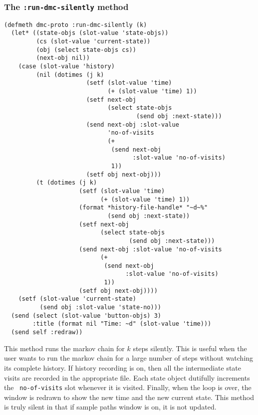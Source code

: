 \subsubsection{The {\tt :run-dmc-silently} method}
\label{subsubsec:run-dmc-silently}
\begin{verbatim}
(defmeth dmc-proto :run-dmc-silently (k)
  (let* ((state-objs (slot-value 'state-objs))
         (cs (slot-value 'current-state))
         (obj (select state-objs cs))
         (next-obj nil))
    (case (slot-value 'history)
         (nil (dotimes (j k)
                       (setf (slot-value 'time)
                             (+ (slot-value 'time) 1))
                       (setf next-obj 
                             (select state-objs 
                                     (send obj :next-state)))
                       (send next-obj :slot-value 
                             'no-of-visits 
                             (+ 
                              (send next-obj 
                                    :slot-value 'no-of-visits)
                              1))
                       (setf obj next-obj)))
         (t (dotimes (j k)
                     (setf (slot-value 'time)
                           (+ (slot-value 'time) 1))
                     (format *history-file-handle* "~d~%" 
                             (send obj :next-state))
                     (setf next-obj 
                           (select state-objs 
                                   (send obj :next-state)))
                     (send next-obj :slot-value 'no-of-visits 
                           (+ 
                            (send next-obj 
                                  :slot-value 'no-of-visits)
                            1))
                     (setf obj next-obj))))
    (setf (slot-value 'current-state) 
          (send obj :slot-value 'state-no)))
  (send (select (slot-value 'button-objs) 3)
        :title (format nil "Time: ~d" (slot-value 'time)))
  (send self :redraw))
\end{verbatim}
This method runs the markov chain for $k$ steps silently.  This is
useful when the user wants to run the markov chain for a large number
of steps without watching its complete history.  If history recording
is on, then all the intermediate state visits are recorded in the
appropriate file.  Each state object dutifully increments the {\tt
  no-of-visits} slot whenever it is visited. Finally, when the loop is
over, the window is redrawn to show the new time and the new current
state. This method is truly silent in that if sample paths window is
on, it is not updated. 

